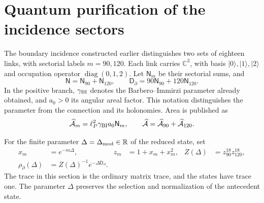 \section{Quantum purification of the incidence sectors}
\label{x_reciprocidad:vii:subsec:purificacion-sectorial}

The boundary incidence constructed earlier distinguishes two sets
of eighteen links, with sectorial labels \(m=90,120\). Each link
carries \(\mathbb C^3\), with basis \(|0\rangle,|1\rangle,|2\rangle\)
and occupation operator \(\operatorname{diag}(0,1,2)\). Let
\(\mathsf N_m\) be their sectorial sums, and
\begin{equation}
 \mathsf N=\mathsf N_{90}+\mathsf N_{120},\qquad
 \mathsf D_\partial=90\mathsf N_{90}+120\mathsf N_{120}.
 \label{x_reciprocidad:vii:eq:ocupaciones-sectoriales}
\end{equation}
In the positive branch, \(\gamma_{\rm BI}\) denotes the Barbero--Immirzi
parameter already obtained, and \(a_0>0\) its angular areal factor.
This notation distinguishes the parameter from the connection and its holonomies.
Area is published as
\begin{equation}
 \widehat{\mathcal A}_m=\ell_P^2\gamma_{\rm BI}a_0\mathsf N_m,
 \qquad
 \widehat{\mathcal A}=\widehat{\mathcal A}_{90}
                         +\widehat{\mathcal A}_{120}.
 \label{x_reciprocidad:vii:eq:area-sectores}
\end{equation}

For the finite parameter \(\Delta=\Delta_{\rm mod}\in\mathbb R\) of the
reduced state, set
\begin{align}
 x_m&=e^{-m\Delta},& z_m&=1+x_m+x_m^2,&
 Z(\Delta)&=z_{90}^{18}z_{120}^{18},\\
 \rho_\partial(\Delta)&=Z(\Delta)^{-1}e^{-\Delta\mathsf D_\partial}.
 \label{x_reciprocidad:vii:eq:estado-sectorial}
\end{align}
The trace in this section is the ordinary matrix trace, and the states
have trace one. The parameter \(\Delta\) preserves the selection and
normalization of the antecedent state.

